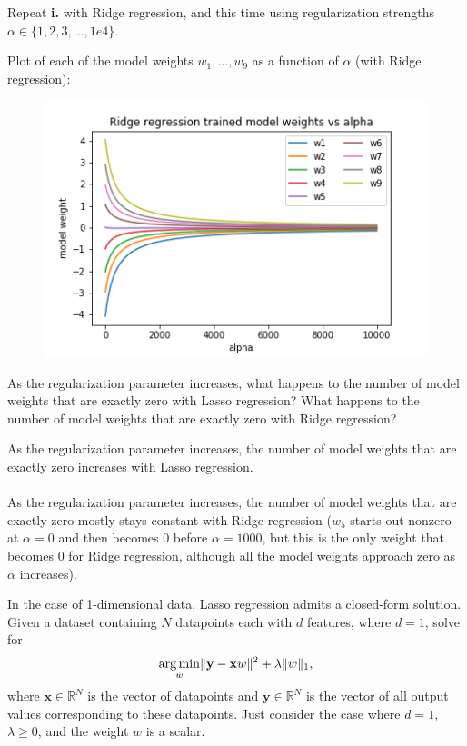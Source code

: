 \subproblem
Repeat \textbf{i.} with Ridge regression, and this time using regularization strengths $\alpha \in \{1, 2, 3, \ldots, 1e4\}$.

Plot of each of the model weights $w_1, ..., w_9$ as a function of $\alpha$ (with Ridge regression):
\noindent
\begin{figure}[H]
\centering
\includegraphics[scale=0.6]{3a_plot_ridge.png}
\end{figure}
\noindent

\subproblem
As the regularization parameter increases, what happens to the number of model weights that are exactly zero with Lasso regression?
What happens to the number of model weights that are exactly zero with Ridge regression?

As the regularization parameter increases, the number of model weights that are exactly zero increases with Lasso regression.\\
\\
As the regularization parameter increases, the number of model weights that are exactly zero mostly stays constant with Ridge regression ($w_5$ starts out nonzero at $\alpha = 0$ and then becomes 0 before $\alpha = 1000$, but this is the only weight that becomes 0 for Ridge regression, although all the model weights approach zero as $\alpha$ increases).

\medskip
\lstset{
  basicstyle=\small\ttfamily,
  breaklines=true,
  columns=fullflexible
}



\problem[18]

\subproblem
In the case of 1-dimensional data, Lasso regression admits a closed-form solution.
Given a dataset containing $N$ datapoints each with $d$ features, where $d = 1$, solve for
\[\underset{w}{\operatorname{arg\,min}} \Vert\mathbf{y} - \mathbf{x}w\Vert^2 + \lambda\Vert w\Vert_1,
\]
where $\mathbf{x} \in \mathbb{R}^{N}$ is the vector of datapoints and $\mathbf{y} \in \mathbb{R}^N$ is the  vector of all output values corresponding to these datapoints. Just consider the case where $d = 1$, $\lambda \geq 0$, and the weight $w$ is a scalar.


